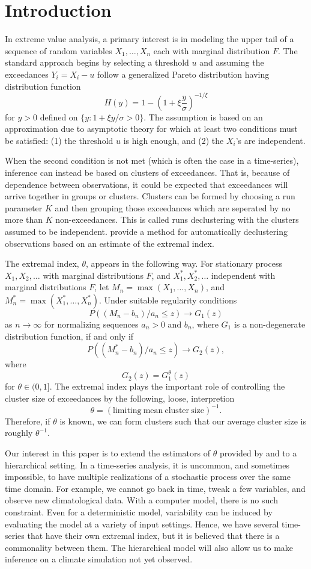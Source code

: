 \section{Introduction}
\label{intro}

In extreme value analysis, a primary interest is in modeling the upper tail of a sequence of random variables $X_1,\ldots,X_n$ each with marginal distribution $F$. The standard approach begins by selecting a threshold $u$ and assuming the exceedances $Y_i=X_i-u$ follow a generalized Pareto distribution having distribution function
\[ H(y) = 1 - \left(1 + \xi \frac{y}{\sigma}\right)^{-1/\xi} \]
for $y>0$ defined on $\{y:1+\xi y/\sigma>0\}$. The assumption is based on an approximation due to asymptotic theory for which at least two conditions must be satisfied: (1) the threshold $u$ is high enough, and (2) the $X_i$'s are independent.

When the second condition is not met (which is often the case in a time-series), inference can instead be based on clusters of exceedances. That is, because of dependence between observations, it could be expected that exceedances will arrive together in groups or clusters. Clusters can be formed by choosing a run parameter $K$ and then grouping those exceedances which are seperated by no more than $K$ non-exceedances. This is called runs declustering with the clusters assumed to be independent. \cite{ferro2003inference} provide a method for automatically declustering observations based on an estimate of the extremal index.

The extremal index, $\theta$, appears in the following way. For stationary process $X_1,X_2,\ldots$ with marginal distributions $F$, and $X_1^*,X_2^*,\ldots$ independent with marginal distributions $F$, let $M_n=\max(X_1,\ldots,X_n)$, and $M_n^*=\max(X_1^*,\ldots,X_n^*)$. Under suitable regularity conditions
\[ P((M_n-b_n)/a_n \leq z) \rightarrow G_1(z) \]
as $n\rightarrow\infty$ for normalizing sequences $a_n>0$ and $b_n$, where $G_1$ is a non-degenerate distribution function, if and only if
\[ P((M_n^*-b_n)/a_n \leq z) \rightarrow G_2(z),\]
where
\[ G_2(z)=G_1^\theta(z) \]
for $\theta\in(0,1]$. The extremal index plays the important role of controlling the cluster size of exceedances by the following, loose, interpretion
\[ \theta = (\mathrm{limiting~mean~cluster~size})^{-1}. \]
Therefore, if $\theta$ is known, we can form clusters such that our average cluster size is roughly $\theta^{-1}$.

Our interest in this paper is to extend the estimators of $\theta$ provided by \cite{ferro2003inference} and \cite{suveges2007likelihood} to a hierarchical setting. In a time-series analysis, it is uncommon, and sometimes impossible, to have multiple realizations of a stochastic process over the same time domain. For example, we cannot go back in time, tweak a few variables, and observe new climatological data. With a computer model, there is no such constraint. Even for a deterministic model, variability can be induced by evaluating the model at a variety of input settings. Hence, we have several time-series that have their own extremal index, but it is believed that there is a commonality between them. The hierarchical model will also allow us to make inference on a climate simulation not yet observed.

